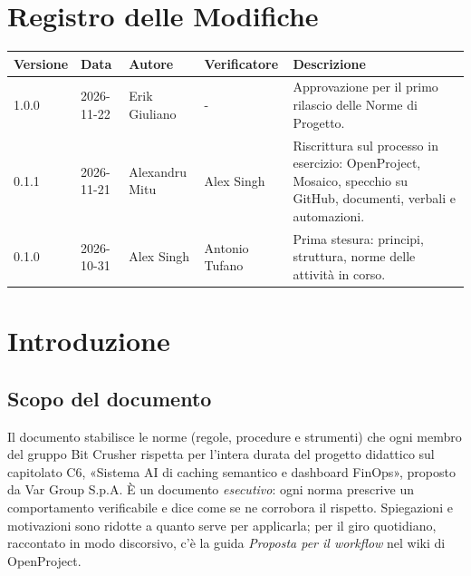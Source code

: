 \documentclass[a4paper, 11pt]{article}
\renewcommand{\arraystretch}{1.25}
\begin{document}
\section*{Registro delle Modifiche}
\begin{center}
    \renewcommand{\arraystretch}{1.5}
    \begin{tabularx}{\textwidth}{|l|l|>{\raggedright\arraybackslash}X|>{\raggedright\arraybackslash}X|>{\raggedright\arraybackslash}X|}
        \hline
        \textbf{Versione} & \textbf{Data} & \textbf{Autore} & \textbf{Verificatore} & \textbf{Descrizione} \\ \hline
        1.0.0 & 2026-11-22 & Erik Giuliano & - & Approvazione per il primo rilascio delle Norme di Progetto. \\ \hline
        0.1.1 & 2026-11-21 & Alexandru Mitu & Alex Singh & Riscrittura sul processo in esercizio: OpenProject, Mosaico, specchio su GitHub, documenti, verbali e automazioni. \\ \hline
        0.1.0 & 2026-10-31 & Alex Singh & Antonio Tufano & Prima stesura: principi, struttura, norme delle attività in corso. \\ \hline
    \end{tabularx}
\end{center}
\newpage

\tableofcontents
\newpage

\section{Introduzione}

\subsection{Scopo del documento}
Il documento stabilisce le norme (regole, procedure e strumenti) che ogni membro del gruppo Bit Crusher rispetta per l'intera durata del progetto didattico sul capitolato C6, «Sistema AI di caching semantico e dashboard FinOps», proposto da Var Group S.p.A.
È un documento \emph{esecutivo}: ogni norma prescrive un comportamento verificabile e dice come se ne corrobora il rispetto. Spiegazioni e motivazioni sono ridotte a quanto serve per applicarla; per il giro quotidiano, raccontato in modo discorsivo, c'è la guida \emph{Proposta per il workflow} nel wiki di OpenProject.
\end{document}
